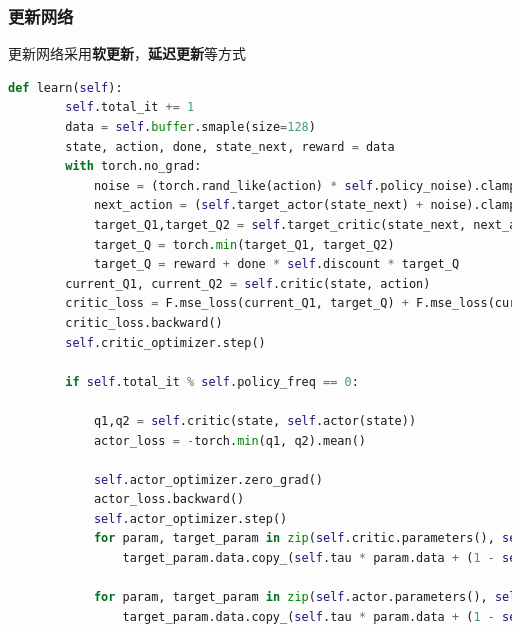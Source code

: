\subsubsection{更新网络}

更新网络采用{\bf 软更新}，{\bf 延迟更新}等方式
\begin{lstlisting}[language=Python]
def learn(self):
        self.total_it += 1
        data = self.buffer.smaple(size=128)
        state, action, done, state_next, reward = data
        with torch.no_grad:
            noise = (torch.rand_like(action) * self.policy_noise).clamp(-self.noise_clip, self.noise_clip)
            next_action = (self.target_actor(state_next) + noise).clamp(-self.max_action, self.max_action)
            target_Q1,target_Q2 = self.target_critic(state_next, next_action)
            target_Q = torch.min(target_Q1, target_Q2)
            target_Q = reward + done * self.discount * target_Q
        current_Q1, current_Q2 = self.critic(state, action)
        critic_loss = F.mse_loss(current_Q1, target_Q) + F.mse_loss(current_Q2, target_Q)
        critic_loss.backward()
        self.critic_optimizer.step()

        if self.total_it % self.policy_freq == 0:

            q1,q2 = self.critic(state, self.actor(state))
            actor_loss = -torch.min(q1, q2).mean()

            self.actor_optimizer.zero_grad()
            actor_loss.backward()
            self.actor_optimizer.step()
            for param, target_param in zip(self.critic.parameters(), self.target_critic.parameters()):
                target_param.data.copy_(self.tau * param.data + (1 - self.tau) * target_param.data)

            for param, target_param in zip(self.actor.parameters(), self.target_actor.parameters()):
                target_param.data.copy_(self.tau * param.data + (1 - self.tau) * target_param.data)
\end{lstlisting}













